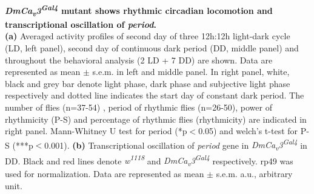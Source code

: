 \label{fig:4}
\textbf{ \emph{DmCa\textsubscript{v}3\textsuperscript{Gal4}} mutant shows rhythmic circadian locomotion and transcriptional oscillation of \emph{period}.}
\\
\textbf{(a)} Averaged activity profiles of second day of three 12h:12h light-dark cycle (LD, left panel), second day of continuous dark period (DD, middle panel) and throughout the behavioral analysis (2 LD + 7 DD) are shown.
Data are represented as mean $\pm$ s.e.m. in left and middle panel.
In right panel, white, black and grey bar denote light phase, dark phase and subjective light phase respectively and dotted line indicates the start day of constant dark period. 
The number of flies (n=37-54) , period of rhythmic flies (n=26-50), power of rhythmicity (P-S) and percentage of rhythmic flies (rhythmicity) are indicated in right panel.
Mann-Whitney U test for period (*p$<$0.05) and welch's t-test for P-S (***p$<$0.001). 
\textbf{(b)} Transcriptional oscillation of \emph{period} gene in  \emph{DmCa\textsubscript{v}3\textsuperscript{Gal4}} in DD. Black and red lines denote \emph{w\textsuperscript{1118}} and \emph{DmCa\textsubscript{v}3\textsuperscript{Gal4}} respectively. rp49 was used for normalization.
Data are represented as mean $\pm$ s.e.m.
a.u., arbitrary unit.
  
  
  
  
  
  
  
  
  
  